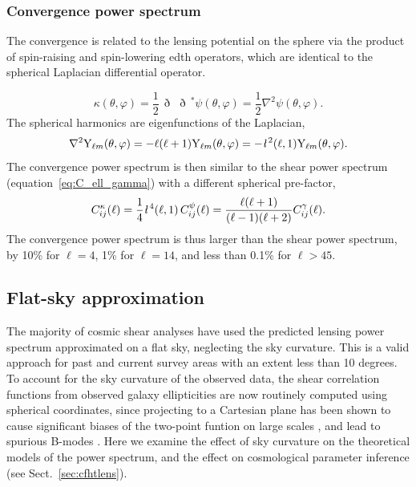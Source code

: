 \documentclass[fleqn,usenatbib]{mnras} %
\newcommand{\ellbar}{\hbox{\it \l}\,}
\newcommand{\edth}{\,\eth\,}
\begin{document}
\subsubsection{Convergence power spectrum}

The convergence is related to the lensing potential on the sphere via the
product of spin-raising and spin-lowering edth operators, which are identical
to the spherical Laplacian differential operator.

%
\begin{equation}
  \kappa(\theta, \varphi) = \frac 1 2 \edth \edth^\ast \psi(\theta, \varphi) = \frac 1 2 \nabla^2 \psi(\theta, \varphi).
  \label{eq:kappa_psi_spher}
\end{equation}
%
The spherical harmonics are eigenfunctions of the Laplacian,
%
\begin{equation}
  \nabla^2 {\rm Y}_{\ell m}(\theta, \varphi) = - \ell (\ell + 1) {\rm Y}_{\ell m}(\theta, \varphi)
    = - \ellbar^2(\ell, 1) {\rm Y}_{\ell m}(\theta, \varphi).
  \label{eq:nabla_Ylm}
\end{equation}
%
The convergence power spectrum is then similar to the shear power spectrum
(equation~\ref{eq:C_ell_gamma}) with a different spherical pre-factor,
\citep{2000PhRvD..62d3007H,jk12}
%
\begin{equation}
  C^\kappa_{ij}(\ell) = \frac 1 4 \ellbar^4(\ell, 1) \, C^\psi_{ij}(\ell)
    = \frac{\ell (\ell+1)}{(\ell-1)(\ell+2)} C^\gamma_{ij}(\ell) .
  \label{eq:C_ell_kappa_full}
\end{equation}
%
The convergence power spectrum is thus larger than the shear power spectrum, by
10\% for $\ell=4$, 1\% for $\ell = 14$, and less than 0.1\% for $\ell>45$.


\subsection{Flat-sky approximation}

The majority of cosmic shear analyses have used the predicted lensing power
spectrum approximated on a flat sky, neglecting the sky curvature. This is a
valid approach for past and current survey areas with an extent less than 10
degrees. To account for the sky curvature of the observed data, the shear
correlation functions from observed galaxy ellipticities are now routinely
computed using spherical coordinates, since projecting to a Cartesian plane has
been shown to cause significant biases of the two-point funtion on large scales
\citep{FSHK08}, and lead to spurious B-modes \citep{asgari/etal:2017}. Here
we examine the effect of sky curvature on the theoretical models of the power
spectrum, and the effect on cosmological parameter inference (see
Sect.~\ref{sec:cfhtlens}).
\end{document}
